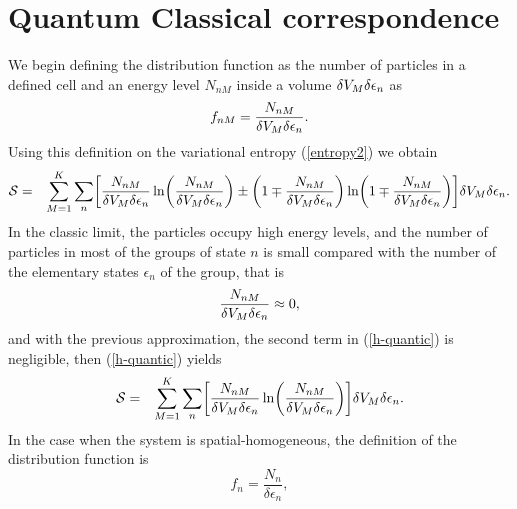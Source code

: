 
\section{Quantum Classical correspondence}
We begin defining the distribution function as the number of particles in a defined cell and an energy level $N_{nM}$ inside a volume $\delta V_M \delta \epsilon_n$ as
\begin{equation}
    f_{nM}=\frac{N_{nM}}{ \delta V_M \delta \epsilon_{n} }.
\end{equation}
Using this definition on the variational entropy (\ref{entropy2}) we obtain
\begin{eqnarray}
    \Ss&=& \sum_{M=1}^{K} \sum_n
    \left[  
           \frac{N_{nM}}{ \de V_M\delta \epsilon_{n}} \ln 
           \left( 
                  \frac{N_{nM}}{ \de V_M\delta \epsilon_{n}}
           \right)\pm 
           \left(  
                  1\mp \frac{N_{nM}}{ \de V_M \delta \epsilon_{n}}
           \right) \ln 
           \left(  
                   1\mp \frac{N_{nM}}{ \de V_M \delta \epsilon_{n}}
           \right)
    \right] \de V_M \delta \epsilon_{n}. \nonumber \\
    \label{h-quantic} 
\end{eqnarray}
In the classic limit, the particles occupy high energy levels, and the number of particles in most of the groups of state $n$ is small compared with the number of the elementary states $\epsilon_n$ of the group, that is
\begin{equation}
    \frac{N_{nM}}{ \delta V_M \delta \epsilon_{n} } \approx 0,
\end{equation}
and with the previous approximation, the second term in (\ref{h-quantic}) is negligible, then (\ref{h-quantic}) yields
\begin{eqnarray}
    \Ss&=& \sum_{M=1}^{K} \sum_n
    \left[  
           \frac{N_{nM}}{ \de V_M \delta \epsilon_{n}} \ln 
           \left( 
                  \frac{N_{nM}}{ \de V_M \delta \epsilon_{n}}
           \right)
    \right] \de V_M \delta \epsilon_{n}. \label{h-quantic2}
\end{eqnarray}
In the case when the system is spatial-homogeneous, the definition of the distribution function is 
\begin{equation}
    f_{n}=\frac{N_{n}}{ \delta \epsilon_{n} },
\end{equation}
